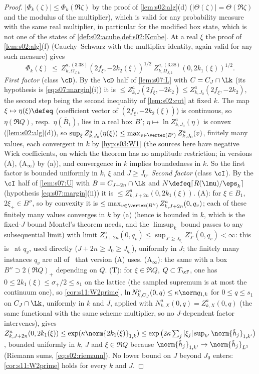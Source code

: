 \begin{proof}
$|\Phi_k(\zeta)|\le\Phi_k(\Re\zeta)$ by the proof of \cref{lem:s02:alg}(d) ($|\Theta(\zeta)|=\Theta(\Re\zeta)$ and the modulus of the multiplier), which is valid for any probability measure with the same real multiplier, in particular for the modified box state, which is not one of the states of \cref{def:s02:acube,def:s02:Kcube}. At a real $\xi$ the proof of \cref{lem:s02:alg}(f) (Cauchy--Schwarz with the multiplier identity, again valid for any such measure) gives
\begin{equation}\label{eq:s08:split}
\Phi_k(\xi)\ \le\ Z^{a,(3.38)}_{k,\Omega_{J,k}}(2f_\xi,-2k_2(\xi))^{1/2}\;Z^{a,(3.38)}_{k,\Omega_{J,k}}(0,2k_1(\xi))^{1/2}.
\end{equation}
\emph{First factor} (class $\cD$). By the $\cD$ half of \cref{lem:s07:L} with $C=C_J\cap\Lk$ (its hypothesis is \eqref{eq:s07:margin}(i)) it is $\le Z^a_{k,J}(2f_\xi,-2k_2)\le Z^a_{k,J_0}(2f_\xi,-2k_2)$, the second step being the second inequality of \cref{lem:s02:cut} at fixed $k$. The map $\xi\mapsto\eta(\xi)\defeq$ (coefficient vector of $(2f_\xi,-2k_2(\xi))$) is continuous, so $\eta(\Re Q)$, resp.\ $\eta(\bar B_1)$, lies in a real box $B'$; $\eta\mapsto\ln Z^a_{k,J_0}(\eta)$ is convex (\cref{lem:s02:alg}(d)), so $\sup_\xi Z^a_{k,J_0}(\eta(\xi))\le\max_{v\in\vertex(B')}Z^a_{k,J_0}(v)$, finitely many values, each convergent in $k$ by \cref{hyp:s03:W1} (the sources here have negative Wick coefficients, on which the theorem has no amplitude restriction; in versions (A), (A$_\infty$) by \Wtwo(a)), and convergence in $k$ implies boundedness in $k$. So the first factor is bounded uniformly in $k$, $\xi$ and $J\ge J_0$.
\emph{Second factor} (class $\cI$). By the $\cI$ half of \cref{lem:s07:U} with $B=C_{J+2n}\cap\Lk$ and $N\defeq\lceil R(\lmu)/\eps_k\rceil$ (hypothesis \eqref{eq:s07:margin}(ii)) it is $\le Z^a_{k,J+2n}(0,2k_1(\xi))$. (A): for $\xi\in B_1$, $2\xi_+\in B''$, so by convexity it is $\le\max_{v\in\vertex(B'')}Z^a_{k,J+2n}(0,q_v)$; each of these finitely many values converges in $k$ by \Wtwo(a) (hence is bounded in $k$, which is the fixed-$J$ bound Montel's theorem needs, and the $\limsup_k$ bound passes to any subsequential limit) with limit $Z^a_{J+2n}(0,q_v)\le\sup_{J'\ge J_{q_v}}Z^a_{J'}(0,q_v)<\infty$: this is \Wtwo\ at $q_v$, used directly ($J+2n\ge J_0\ge J_{q_v}$), uniformly in $J$; the finitely many instances $q_v$ are all of \Wtwo\ that version (A) uses. (A$_\infty$): the same with a box $B''\supset2(\Re Q)_+$ depending on $Q$. (T): for $\xi\in\Re Q$, $Q\subset T_\cF$, one has $0\le2k_1(\xi)\le\sigma_+/2\le s_1$ on the lattice (the sampled supremum is at most the continuum one), so \cref{cor:s11:W2prime}, $\ln N^a_{k,C_J}(0,q)\le\kappa\norm q_{1,k}$ for $0\le q\le s_1$ on $C_J\cap\Lk$, uniformly in $k$ and $J$, applied with $N^a_{k,X}(0,q)=Z^a_{k,X}(0,q)$ (the same functional with the same scheme multiplier, so no $J$-dependent factor intervenes), gives $Z^a_{k,J+2n}(0,2k_1(\xi))\le\exp(\kappa\norm{2k_1(\xi)}_{1,k})\le\exp\big(2\kappa\sum_j|\xi_j|\sup_{k'}\norm{\tilde h_j}_{1,k'}\big)$, bounded uniformly in $k$, $J$ and $\xi\in\Re Q$ because $\norm{\tilde h_j}_{1,k'}\to\norm{\tilde h_j}_{L^1}$ (Riemann sums, \eqref{eq:s02:riemann}). No lower bound on $J$ beyond $J_0$ enters: \cref{cor:s11:W2prime} holds for every $k$ and $J$.

\end{proof}
